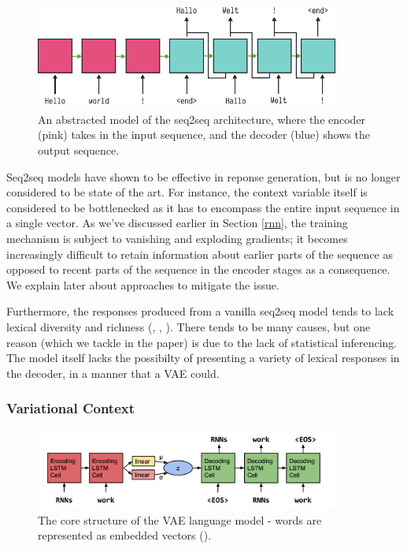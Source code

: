 \documentclass[12pt,twoside]{report}
\begin{document}
\begin{figure}[!ht]
		
\centering
\includegraphics[width=100mm]{diagrams/seq2seq.pdf}
\caption{An abstracted model of the seq2seq architecture, where the encoder (pink) takes in the input sequence, and the decoder (blue) shows the output sequence.\label{seq2seq}}
\end{figure}

Seq2seq models have shown to be effective in reponse generation, but is no longer considered to be state of the art. For instance, the context variable itself is considered to be bottlenecked as it has to encompass the entire input sequence in a single vector. As we've discussed earlier in Section \ref{rnn}, the training mechanism is subject to vanishing and exploding gradients; it becomes increasingly difficult to retain information about earlier parts of the sequence as opposed to recent parts of the sequence in the encoder stages as a consequence. We explain later about approaches to mitigate the issue.

Furthermore, the responses produced from a vanilla seq2seq model tends to lack lexical diversity and richness (\cite{serban_hierarchical_2016}, \cite{zhao_learning_2017}, \cite{jiang_why_2018}). There tends to be many causes, but one reason (which we tackle in the paper) is due to the lack of statistical inferencing. The model itself lacks the possibilty of presenting a variety of lexical responses in the decoder, in a manner that a VAE could.

\subsubsection{Variational Context}
\label{variational_context}

\begin{figure}[!ht]
	\centering
	\includegraphics[width=100mm]{diagrams/seq2seqvae.png}
	\caption{The core structure of the VAE language model - words are represented as embedded vectors (\cite{bowman_generating_2015}). \label{vae_seq2seq}}
\end{figure}
\end{document}
